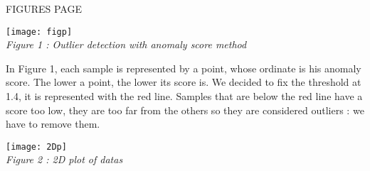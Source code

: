 \documentclass[10pt]{report}
\begin{document}
\clearpage

\begin{center}
\Large FIGURES PAGE
\end{center}

\bigbreak
\bigbreak
\bigbreak
\bigbreak

\begin{minipage}[c]{.46\linewidth} 
\begin{center}
\texttt{[image: figp]}\\
\emph{Figure 1 : Outlier detection with anomaly score method} \\[0.5cm]
\end{center}
\end{minipage}
\begin{minipage}[c]{.46\linewidth} 
\begin{flushleft}
\small
In Figure 1, each sample is represented by a point, whose ordinate is his anomaly score. The lower a point, the lower its score is. We decided to fix the threshold at 1.4, it is represented with the red line. Samples that are below the red line have a score too low, they are too far from the others so they are considered outliers :  we have to remove them.\bigbreak
\begin{center}
\texttt{[image: 2Dp]}\\
\emph{Figure 2 : 2D plot of datas}
\end{center}
\end{flushleft}
\end{minipage}

\bigbreak
\bigbreak
\bigbreak
\end{document}
